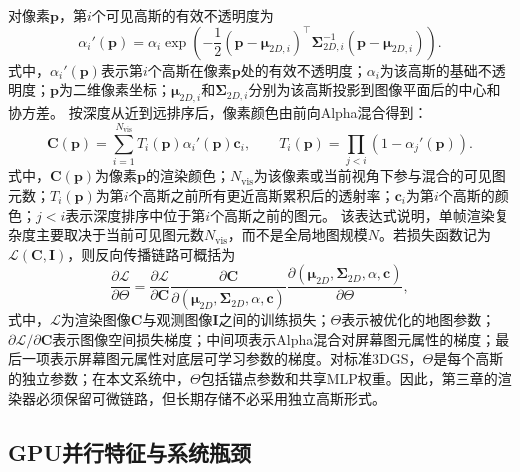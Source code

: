 对像素$\mathbf{p}$，第$i$个可见高斯的有效不透明度为
\begin{equation}
\alpha_i'(\mathbf{p}) =
\alpha_i
\exp\left(
-\frac{1}{2}
(\mathbf{p}-\boldsymbol{\mu}_{2D,i})^\top
\boldsymbol{\Sigma}_{2D,i}^{-1}
(\mathbf{p}-\boldsymbol{\mu}_{2D,i})
\right).
\end{equation}
式中，$\alpha_i'(\mathbf{p})$表示第$i$个高斯在像素$\mathbf{p}$处的有效不透明度；$\alpha_i$为该高斯的基础不透明度；$\mathbf{p}$为二维像素坐标；$\boldsymbol{\mu}_{2D,i}$和$\boldsymbol{\Sigma}_{2D,i}$分别为该高斯投影到图像平面后的中心和协方差。
按深度从近到远排序后，像素颜色由前向Alpha混合得到：
\begin{equation}
\mathbf{C}(\mathbf{p}) =
\sum_{i=1}^{N_{\mathrm{vis}}}
T_i(\mathbf{p})\alpha_i'(\mathbf{p})\mathbf{c}_i,
\qquad
T_i(\mathbf{p})=
\prod_{j<i}(1-\alpha_j'(\mathbf{p})).
\end{equation}
式中，$\mathbf{C}(\mathbf{p})$为像素$\mathbf{p}$的渲染颜色；$N_{\mathrm{vis}}$为该像素或当前视角下参与混合的可见图元数；$T_i(\mathbf{p})$为第$i$个高斯之前所有更近高斯累积后的透射率；$\mathbf{c}_i$为第$i$个高斯的颜色；$j<i$表示深度排序中位于第$i$个高斯之前的图元。
该表达式说明，单帧渲染复杂度主要取决于当前可见图元数$N_{\mathrm{vis}}$，而不是全局地图规模$N$。若损失函数记为$\mathcal{L}(\mathbf{C},\mathbf{I})$，则反向传播链路可概括为
\begin{equation}
\frac{\partial\mathcal{L}}{\partial\Theta}
=
\frac{\partial\mathcal{L}}{\partial\mathbf{C}}
\frac{\partial\mathbf{C}}{\partial(\boldsymbol{\mu}_{2D},\boldsymbol{\Sigma}_{2D},\alpha,\mathbf{c})}
\frac{\partial(\boldsymbol{\mu}_{2D},\boldsymbol{\Sigma}_{2D},\alpha,\mathbf{c})}{\partial\Theta},
\end{equation}
式中，$\mathcal{L}$为渲染图像$\mathbf{C}$与观测图像$\mathbf{I}$之间的训练损失；$\Theta$表示被优化的地图参数；$\partial\mathcal{L}/\partial\mathbf{C}$表示图像空间损失梯度；中间项表示Alpha混合对屏幕图元属性的梯度；最后一项表示屏幕图元属性对底层可学习参数的梯度。对标准3DGS，$\Theta$是每个高斯的独立参数；在本文系统中，$\Theta$包括锚点参数和共享MLP权重。因此，第三章的渲染器必须保留可微链路，但长期存储不必采用独立高斯形式。

\subsection{GPU并行特征与系统瓶颈}

